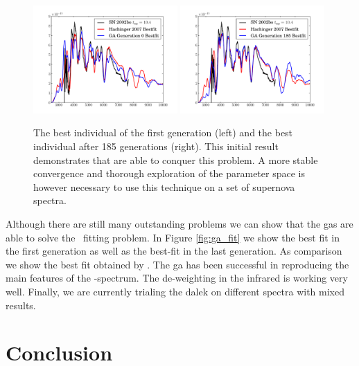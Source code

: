 \begin{figure}[htbp] %
   \centering
   \includegraphics[width=0.49\textwidth]{chapter_dalek/plots/plot_ga0_speccompare.pdf} 
   \includegraphics[width=0.49\textwidth]{chapter_dalek/plots/plot_ga185_speccompare.pdf} 
   \caption{The best individual of the first generation (left) and the best individual after 185 generations (right). This initial result demonstrates that  are able to conquer this problem. A more stable convergence and thorough exploration of the parameter space is however necessary to use this technique on a set of supernova spectra.}
   \label{fig:example}
\end{figure}

Although there are still many outstanding problems we can show that the \glspl{ga} are able to solve the \sneia\ fitting problem. In Figure \ref{fig:ga_fit} we show the best fit in the first generation as well as the best-fit in the last generation. As comparison we show the best fit obtained by \citet{hachinger_dipl2007}. The \gls{ga} has been successful in reproducing the main features of the \sneia-spectrum. The de-weighting in the infrared is working very well. Finally, we are currently trialing the \gls{dalek} on different spectra with mixed results. 


\section{Conclusion}
\label{sec:dalek_conclusion}


